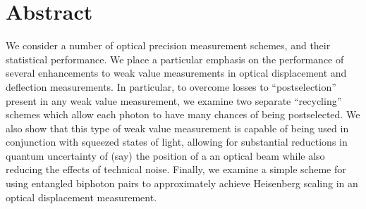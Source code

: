\chapter*{Abstract}

We consider a number of optical precision measurement schemes, and their statistical performance.  We place a particular emphasis on the performance of several enhancements to weak value measurements in optical displacement and deflection measurements.  In particular, to overcome losses to ``postselection'' present in any weak value measurement, we examine two separate ``recycling'' schemes which allow each photon to have many chances of being postselected.  We also show that this type of weak value measurement is capable of being used in conjunction with squeezed states of light, allowing for substantial reductions in quantum uncertainty of (say) the position of a an optical beam while also reducing the effects of technical noise.  Finally, we examine a simple scheme for using entangled biphoton pairs to approximately achieve Heisenberg scaling in an optical displacement measurement. 
